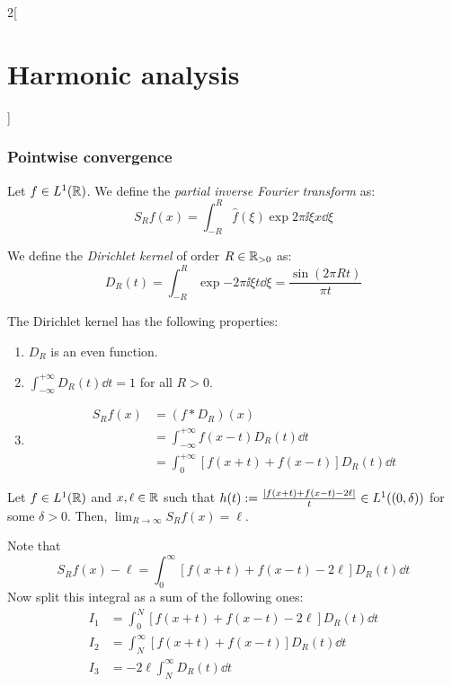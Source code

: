 \documentclass[../../../main_math.tex]{subfiles}
\begin{document}
\begin{multicols}{2}[\section{Harmonic analysis}]
  \subsubsection{Pointwise convergence}
  \begin{definition}
    Let $f\in L^1(\mathbb{R})$. We define the \emph{partial inverse Fourier transform} as: $$S_Rf(x)=\int_{-R}^{R}\widehat{f}(\xi)\exp{2\pi\ii \xi x}\dd{\xi}$$
  \end{definition}
  \begin{definition}
    We define the \emph{Dirichlet kernel} of order $R\in\mathbb{R}_{>0}$ as: $$D_R(t)=\int_{-R}^{R}\exp{-2\pi\ii \xi t}\dd{\xi}=\frac{\sin(2\pi Rt)}{\pi t}$$
  \end{definition}
  \begin{proposition}
    The Dirichlet kernel has the following properties:
    \begin{enumerate}
      \item $D_R$ is an even function.
      \item $\displaystyle \int_{-\infty}^{+\infty}D_R(t)\dd{t}=1$ for all $R>0$.
      \item \begin{align*}
              S_Rf(x) & =(f*D_R)(x)                                  \\
                      & =\int_{-\infty}^{+\infty}f(x-t)D_R(t)\dd{t}  \\
                      & =\int_0^{+\infty}[f(x+t)+f(x-t)]D_R(t)\dd{t}
            \end{align*}
    \end{enumerate}
  \end{proposition}
  \begin{theorem}\label{HA:dini}
    Let $f\in L^1(\mathbb{R})$ and $x,\ell\in \mathbb{R}$ such that $h(t):=\frac{\abs{f(x+t)+f(x-t)-2\ell}}{t}\in L^1((0,\delta))$ for some $\delta>0$. Then, $\displaystyle\lim_{R\to\infty}S_Rf(x)=\ell$.
  \end{theorem}
  \begin{sproof}
    Note that $$S_Rf(x)-\ell=\int_0^\infty[f(x+t)+f(x-t)-2\ell]D_R(t)\dd{t}$$ Now split this integral as a sum of the following ones:
    \begin{align*}
      I_1 & =\int_0^N[f(x+t)+f(x-t)-2\ell]D_R(t)\dd{t} \\
      I_2 & =\int_N^\infty[f(x+t)+f(x-t)]D_R(t)\dd{t}  \\
      I_3 & =-2\ell \int_N^\infty D_R(t)\dd{t}
    \end{align*}

\end{sproof}
\end{multicols}
\end{document}

